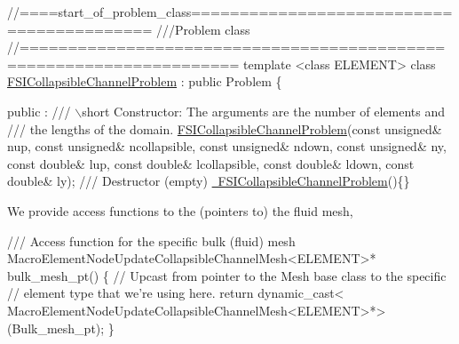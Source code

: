  
\begin{DoxyCodeInclude}
\textcolor{comment}{//====start\_of\_problem\_class==========================================}
\textcolor{comment}{///Problem class}
\textcolor{comment}{}\textcolor{comment}{//====================================================================}
\textcolor{keyword}{template} <\textcolor{keyword}{class} ELEMENT>
\textcolor{keyword}{class }\hyperlink{classFSICollapsibleChannelProblem}{FSICollapsibleChannelProblem} : \textcolor{keyword}{public} Problem
\{

 public :
\textcolor{comment}{}
\textcolor{comment}{/// \(\backslash\)short Constructor: The arguments are the number of elements and}
\textcolor{comment}{/// the lengths of the domain.}
\textcolor{comment}{} \hyperlink{classFSICollapsibleChannelProblem_afe14ae0d2bdfc9a15969c9bdcd6e2512}{FSICollapsibleChannelProblem}(\textcolor{keyword}{const} \textcolor{keywordtype}{unsigned}& nup, 
                       \textcolor{keyword}{const} \textcolor{keywordtype}{unsigned}& ncollapsible,
                       \textcolor{keyword}{const} \textcolor{keywordtype}{unsigned}& ndown,
                       \textcolor{keyword}{const} \textcolor{keywordtype}{unsigned}& ny,
                       \textcolor{keyword}{const} \textcolor{keywordtype}{double}& lup,
                       \textcolor{keyword}{const} \textcolor{keywordtype}{double}& lcollapsible, 
                       \textcolor{keyword}{const} \textcolor{keywordtype}{double}& ldown,
                       \textcolor{keyword}{const} \textcolor{keywordtype}{double}& ly);
 \textcolor{comment}{}
\textcolor{comment}{ /// Destructor (empty)}
\textcolor{comment}{} \hyperlink{classFSICollapsibleChannelProblem_abe33aaaae15ea3eb10885527a1d1ad9a}{~FSICollapsibleChannelProblem}()\{\}

\end{DoxyCodeInclude}


We provide access functions to the (pointers to) the fluid mesh, 
\begin{DoxyCodeInclude}
 \textcolor{comment}{/// Access function for the specific bulk (fluid) mesh}
 MacroElementNodeUpdateCollapsibleChannelMesh<ELEMENT>* bulk\_mesh\_pt() 
  \{
   \textcolor{comment}{// Upcast from pointer to the Mesh base class to the specific }
   \textcolor{comment}{// element type that we're using here.}
   \textcolor{keywordflow}{return} \textcolor{keyword}{dynamic\_cast<}
    MacroElementNodeUpdateCollapsibleChannelMesh<ELEMENT>*\textcolor{keyword}{>}
    (Bulk\_mesh\_pt);
  \}

\end{DoxyCodeInclude}


